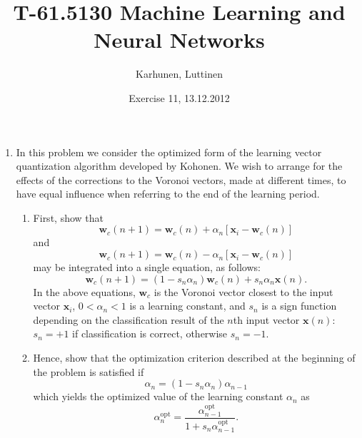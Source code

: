 
\title{T-61.5130 Machine Learning and Neural Networks}
\author{Karhunen, Luttinen}
\date{Exercise 11, 13.12.2012}

\newcommand{\vect}[1]{{\bf{#1}}}
\newcommand{\svect}[1]{\boldsymbol{#1}}
\newcommand{\matr}[1]{\boldsymbol{#1}}




\maketitle

\begin{enumerate}

\item In this problem we consider the optimized form of the learning
  vector quantization algorithm developed by
  Kohonen. We wish to arrange for the effects of the corrections to the
  Voronoi vectors, made at different times, to have equal influence when
  referring to the end of the learning period. \begin{enumerate}
  \item First, show that
    \begin{equation}
      \mathbf{w}_c(n+1)=\mathbf{w}_c(n)+\alpha_n[\mathbf{x}_i-\mathbf{w}_c(n)]
      \label{equation: 1}
    \end{equation}
    and
    \begin{equation}
      \mathbf{w}_c(n+1)=\mathbf{w}_c(n)-\alpha_n[\mathbf{x}_i-\mathbf{w}_c(n)]
      \label{equation: 2}
    \end{equation}
    may be integrated into a single equation, as follows:
    \begin{equation}
      \mathbf{w}_c(n+1)=(1-s_n\alpha_n)\mathbf{w}_c(n)+s_n\alpha_n\mathbf{x}(n).
      \label{equation: 3}
    \end{equation}
    In the above equations, $\mathbf{w}_c$ is the Voronoi
    vector closest to the input vector $\mathbf{x}_i$, $0<\alpha_n<1$ is a
    learning constant, and $s_n$ is a sign function depending on the
    classification result of the $n$th input vector $\mathbf{x}(n)$:
    $s_n=+1$ if classification is correct, otherwise  $s_n=-1$.

  \item Hence, show that the optimization criterion described at the
    beginning of the problem is satisfied if
    \begin{equation*}
      \alpha_n=(1-s_n\alpha_n)\alpha_{n-1}
    \end{equation*}
    which yields the optimized value of the learning constant
    $\alpha_n$ as
    \begin{equation*}
      \alpha_n^{\text{opt}}=\frac{\alpha_{n-1}^{\text{opt}}}{1+s_n\alpha_{n-1}^{\text{opt}}}.
    \end{equation*}
  \end{enumerate}


\end{enumerate}
